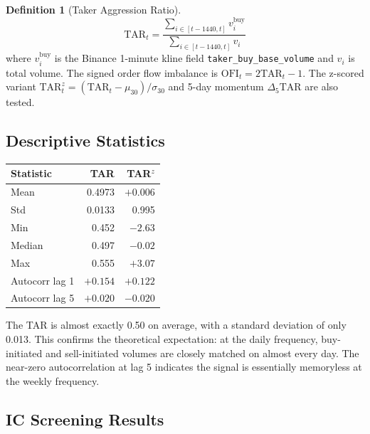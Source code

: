 \documentclass[12pt, a4paper]{article}
\theoremstyle{plain}
\theoremstyle{definition}
\newtheorem{definition}{Definition}[section]
\newcommand{\TAR}{\mathrm{TAR}}
\begin{document}
\begin{definition}[Taker Aggression Ratio]
  \begin{equation}
    \TAR_t = \frac{\sum_{i \in [t-1440, t]} v^{\mathrm{buy}}_i}
                  {\sum_{i \in [t-1440, t]} v_i}
  \end{equation}
  where $v^{\mathrm{buy}}_i$ is the Binance 1-minute kline field
  \texttt{taker\_buy\_base\_volume} and $v_i$ is total volume.
  The signed order flow imbalance is $\mathrm{OFI}_t = 2\TAR_t - 1$.
  The z-scored variant $\TAR^z_t = (\TAR_t - \mu_{30}) / \sigma_{30}$
  and 5-day momentum $\Delta_5\TAR$ are also tested.
\end{definition}

\subsection{Descriptive Statistics}

\begin{center}
\begin{tabular}{lrr}
\toprule
Statistic & TAR & TAR$^z$ \\
\midrule
Mean   & 0.4973 & $+0.006$ \\
Std    & 0.0133 &  0.995  \\
Min    & 0.452  & $-2.63$ \\
Median & 0.497  & $-0.02$ \\
Max    & 0.555  & $+3.07$ \\
\midrule
Autocorr lag 1  & $+0.154$ & $+0.122$ \\
Autocorr lag 5  & $+0.020$ & $-0.020$ \\
\bottomrule
\end{tabular}
\end{center}

The TAR is almost exactly 0.50 on average, with a standard deviation of
only 0.013.  This confirms the theoretical expectation: at the daily
frequency, buy-initiated and sell-initiated volumes are closely matched
on almost every day.  The near-zero autocorrelation at lag 5 indicates
the signal is essentially memoryless at the weekly frequency.

\subsection{IC Screening Results}
\end{document}
